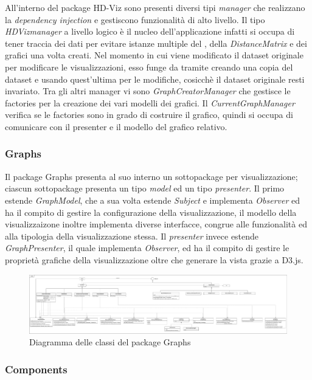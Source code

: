 \documentclass[../manuale_sviluppatore.tex]{subfiles}
\begin{document}
All'interno del package HD-Viz sono presenti diversi tipi \emph{manager} che realizzano la 
\emph{dependency injection} e gestiscono funzionalità di alto livello. Il tipo \emph{HDVizmanager} 
a livello logico è il nucleo dell'applicazione infatti si occupa di tener traccia dei dati per 
evitare istanze multiple del , della \emph{DistanceMatrix} e dei grafici una 
volta creati. Nel momento in cui viene modificato il dataset originale per modificare le 
visualizzazioni, esso funge da tramite creando una copia del dataset e usando quest'ultima per le 
modifiche, cosicchè il dataset originale resti invariato.
Tra gli altri manager vi sono \emph{GraphCreatorManager} che gestisce le factories per la 
creazione dei vari modelli dei grafici. Il \emph{CurrentGraphManager} verifica se le factories sono 
in grado di costruire il grafico, quindi si occupa di comunicare con il presenter e il modello del 
grafico relativo.

\subsubsection*{Graphs}

Il package Graphs presenta al suo interno un sottopackage per visualizzazione; ciascun sottopackage 
presenta un tipo \emph{model} ed un tipo \emph{presenter}. Il primo estende \emph{GraphModel}, che 
a sua volta estende \emph{Subject} e implementa \emph{Observer} ed ha il compito di gestire la 
configurazione della visualizzazione, il modello della visualizzaizone inoltre implementa diverse 
interfacce, congrue alle  funzionalità ed alla tipologia della visualizzazione stessa. Il 
\emph{presenter} invece estende \emph{GraphPresenter}, il quale implementa \emph{Observer}, ed ha 
il compito di gestire le proprietà grafiche della visualizzazione oltre che generare la 
vista grazie a D3.js.

\begin{figure}[H]
	\centering
	\includegraphics[width=18cm]{src/img/graphs.pdf}
	\caption{Diagramma delle classi del package Graphs}
\end{figure}


\subsubsection*{Components}
\end{document}
